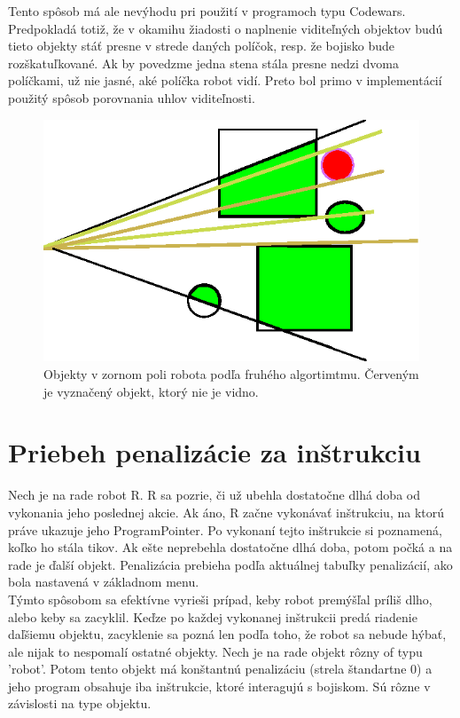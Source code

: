 \indent
\newline
\indent Tento spôsob má ale nevýhodu pri použití v programoch typu Codewars. Predpokladá totiž, že v okamihu žiadosti o naplnenie viditeľných objektov budú tieto objekty stáť presne v strede daných políčok, resp. že bojisko bude rozškatuľkované. Ak by povedzme jedna stena stála presne nedzi dvoma políčkami, už nie jasné, aké políčka robot vidí. Preto bol primo v implementácií použitý spôsob porovnania uhlov viditeľnosti.
\\
\begin{figure}
\centering
\includegraphics{visibility2}
\caption { Objekty v zornom poli robota podľa fruhého algortimtmu. Červeným je vyznačený objekt, ktorý nie je vidno.}
\label{fig:visibleo}
\end{figure}
\indent
\section{Priebeh penalizácie za inštrukciu}
Nech je na rade robot R. R sa pozrie, či už ubehla dostatočne dlhá doba od vykonania jeho poslednej akcie. Ak áno, R začne vykonávať inštrukciu, na ktorú práve ukazuje jeho ProgramPointer. Po vykonaní tejto inštrukcie si poznamená, koľko ho stála tikov. Ak ešte neprebehla dostatočne dlhá doba, potom počká a na rade je ďalší objekt. Penalizácia prebieha podľa aktuálnej tabuľky penalizácií, ako bola nastavená v základnom menu. \\

Týmto spôsobom sa efektívne vyrieši prípad, keby robot premýšľal príliš dlho, alebo keby sa zacyklil. Keďze po každej vykonanej inštrukcii predá riadenie daľšiemu objektu, zacyklenie sa pozná len podľa toho, že robot sa nebude hýbať, ale nijak to nespomalí ostatné objekty.%
\newline
Nech je na rade objekt rôzny of typu 'robot'. Potom tento objekt má konštantnú penalizáciu (strela štandartne 0) a jeho program obsahuje iba inštrukcie, ktoré interagujú s bojiskom. Sú rôzne v závislosti na type objektu.

